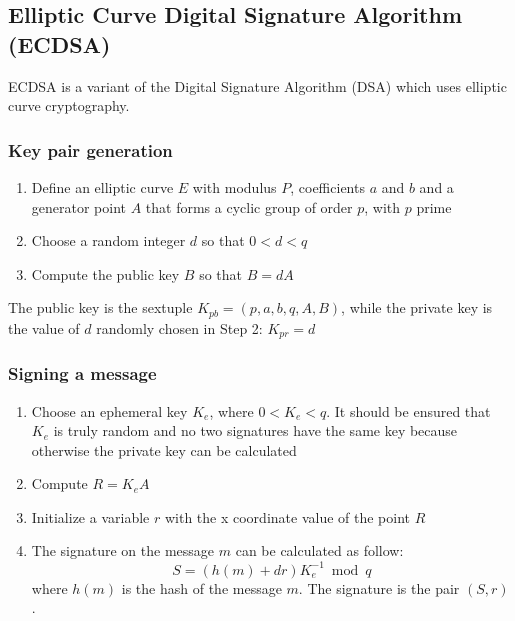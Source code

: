 \subsection{Elliptic Curve Digital Signature Algorithm (ECDSA)}
ECDSA is a variant of the Digital Signature Algorithm (DSA) which uses elliptic
curve cryptography.

\subsubsection{Key pair generation}
\begin{enumerate}
  \item Define an elliptic curve $E$ with modulus $P$, coefficients $a$ and $b$ and a
  generator point $A$ that forms a cyclic group of order $p$, with $p$ prime
  \item Choose a random integer $d$ so that ${0 < d < q}$
  \item Compute the public key $B$ so that ${B = d  A}$
\end{enumerate}
The public key is the sextuple ${K_{pb} = (p,a,b,q,A,B)}$, while the private key
is the value of $d$ randomly chosen in Step 2: ${K_{pr} = d}$

\subsubsection{Signing a message}
\begin{enumerate}
  \item Choose an ephemeral key $K_e$, where ${0 < K_e < q}$.
  It should be ensured that $K_e$ is truly random and no two signatures have the same key
  because otherwise the private key can be calculated
  \item Compute ${R = K_e A}$
  \item Initialize a variable $r$ with the x coordinate value of the point $R$
  \item The signature on the message $m$ can be calculated as follow:
  \[{S=(h(m)+d r)K_e^{-1}\bmod q}\]
  where $h(m)$ is the hash of the message $m$. The signature is the pair ${(S,r)}$.
\end{enumerate}

